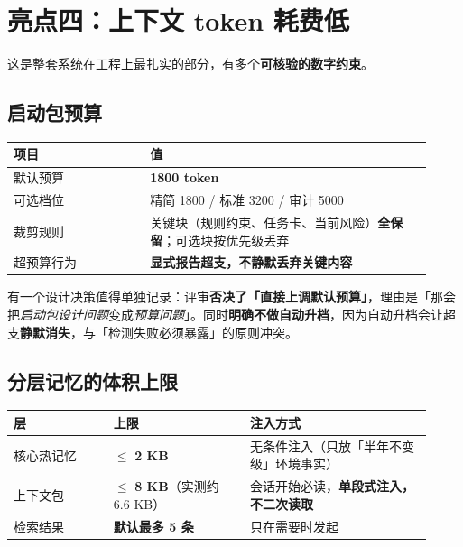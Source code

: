 \documentclass[11pt,a4paper]{ctexart}
\begin{document}
\section{亮点四：上下文 token 耗费低}

这是整套系统在工程上最扎实的部分，有多个\textbf{可核验的数字约束}。

\subsection{启动包预算}

\begin{center}
\begin{tabular}{@{}p{0.30\linewidth}p{0.62\linewidth}@{}}
\toprule
\textbf{项目} & \textbf{值} \\
\midrule
默认预算 & \textbf{1800 token} \\
可选档位 & 精简 1800 / 标准 3200 / 审计 5000 \\
裁剪规则 & 关键块（规则约束、任务卡、当前风险）\textbf{全保留}；可选块按优先级丢弃 \\
超预算行为 & \textbf{显式报告超支，不静默丢弃关键内容} \\
\bottomrule
\end{tabular}
\end{center}

有一个设计决策值得单独记录：评审\textbf{否决了「直接上调默认预算」}，理由是「那会把\emph{启动包设计问题}变成\emph{预算问题}」。同时\textbf{明确不做自动升档}，因为自动升档会让超支\textbf{静默消失}，与「检测失败必须暴露」的原则冲突。

\subsection{分层记忆的体积上限}

\begin{center}
\begin{tabular}{@{}p{0.22\linewidth}p{0.30\linewidth}p{0.40\linewidth}@{}}
\toprule
\textbf{层} & \textbf{上限} & \textbf{注入方式} \\
\midrule
核心热记忆 & $\le$ \textbf{2 KB} & 无条件注入（只放「半年不变级」环境事实） \\
上下文包 & $\le$ \textbf{8 KB}（实测约 6.6 KB） & 会话开始必读，\textbf{单段式注入，不二次读取} \\
检索结果 & \textbf{默认最多 5 条} & 只在需要时发起 \\
\bottomrule
\end{tabular}
\end{center}
\end{document}
